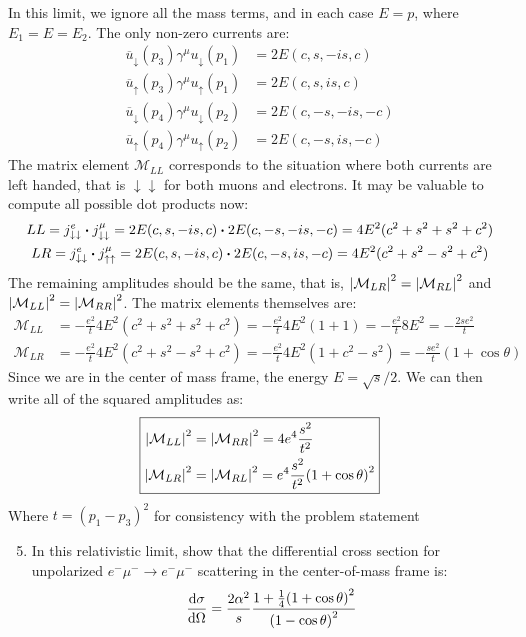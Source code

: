 \documentclass[12pt]{article}
\renewcommand{\bar}{\overline}
\newcommand{\M}{\mathcal{M}}
\begin{document}
In this limit, we ignore all the mass terms, and in each case $E=p$, where $E_1=E=E_2$. The only non-zero currents are:
\begin{align*}
  \bar{u}_\downarrow(p_3)\gamma^\mu u_\downarrow(p_1)&=2E(c,s,-is,c)\\
  \bar{u}_\uparrow(p_3)\gamma^\mu u_\uparrow(p_1)&=2E(c,s,is,c)\\
  \bar{u}_\downarrow(p_4)\gamma^\mu u_\downarrow(p_2)&=2E(c,-s,-is,-c)\\
  \bar{u}_\uparrow(p_4)\gamma^\mu u_\uparrow(p_2)&=2E(c,-s,is,-c)
\end{align*}
The matrix element $\M_{LL}$ corresponds to the situation where both currents are left handed, that is $\downarrow\downarrow$ for both muons and electrons. It may be valuable to compute all possible dot products now:
\begin{gather*}
  LL=j^e_{\downarrow\downarrow}\vdot j^\mu_{\downarrow\downarrow}
  =2E(c,s,-is,c)\vdot2E(c,-s,-is,-c)=4E^2(c^2+s^2+s^2+c^2)\\
  LR=j^e_{\downarrow\downarrow}\vdot j^\mu_{\uparrow\uparrow}
  =2E(c,s,-is,c)\vdot2E(c,-s,is,-c)=4E^2(c^2+s^2-s^2+c^2)
\end{gather*}
The remaining amplitudes should be the same, that is, $\abs{\M_{LR}}^2=\abs{\M_{RL}}^2$ and $\abs{\M_{LL}}^2=\abs{\M_{RR}}^2$. The matrix elements themselves are:
\begin{align*}
  \M_{LL}&=-\frac{e^2}{t}4E^2(c^2+s^2+s^2+c^2)=
  -\frac{e^2}{t}4E^2(1+1)=-\frac{e^2}{t}8E^2=-\frac{2se^2}{t}\\
  \M_{LR}&=-\frac{e^2}{t}4E^2(c^2+s^2-s^2+c^2)=
  -\frac{e^2}{t}4E^2(1+c^2-s^2)=-\frac{se^2}{t}(1+\cos\theta)
\end{align*}
Since we are in the center of mass frame, the energy $E=\sqrt{s}/2$. We can then write all of the squared amplitudes as:
\begin{equation}
  \label{eq:p3d}
  \boxed{
    \begin{aligned}
      \abs{\M_{LL}}^2&=\abs{\M_{RR}}^2=4e^4\frac{s^2}{t^2}\\
      \abs{\M_{LR}}^2&=\abs{\M_{RL}}^2=e^4\frac{s^2}{t^2}{(1+\cos\theta)}^2
    \end{aligned}
  }
\end{equation}
Where $t={(p_1-p_3)}^2$ for consistency with the problem statement
\begin{problem}
  \begin{enumerate}[label = (\alph*)]
    \setcounter{enumi}{4}
  \item In this relativistic limit, show that the differential cross section for unpolarized $e^-\mu^-\to e^-\mu^-$ scattering in the center-of-mass frame is:
    \begin{align*}
      \dv{\sigma}{\Omega}=\frac{2\alpha^2}{s}
      \frac{1+\frac14{(1+\cos\theta)}^2}{{(1-\cos\theta)}^2}
    \end{align*}
  \end{enumerate}
\end{problem}
\end{document}
